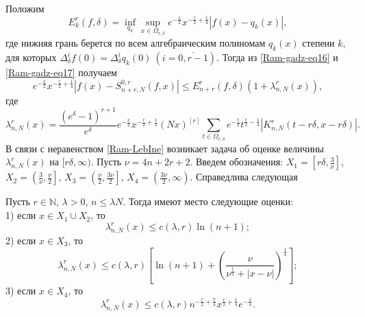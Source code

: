 Положим
\begin{equation}\label{Ram-gadz-eq17}
E_{k}^r(f,\delta)=\inf_{q_{k}}\sup_{x\in\Omega_{r,\delta}} e^{-{\frac{x}{2}}}x^{-{\frac{r}{2}}+{\frac{1}{4}}}\left|f(x)-q_{k}(x)\right|,
\end{equation}
где нижняя грань берется по всем алгебраическим полиномам $q_{k}(x)$ степени $k,$ для которых $\Delta_\delta^i f(0)=\Delta_\delta^i q_{k}(0)\ (i=\overline{0, r-1}).$
Тогда из \eqref{Ram-gadz-eq16} и \eqref{Ram-gadz-eq17} получаем
\begin{equation}\label{Ram-LebIne}
e^{-{\frac{x}{2}}}x^{-{\frac{r}{2}}+{\frac{1}{4}}}\left|f(x)-S_{n+r,N}^{0,r}(f,x)\right|\leq E_{n+r}^r(f,\delta)(1+\lambda_{n,N}^{r}(x)),
\end{equation}
где
$$
\lambda_{n,N}^{r}(x)=\frac{(e^{\delta}-1)^{r+1}}{e^\delta}e^{-{\frac{x}{2}}}x^{-{\frac{r}{2}}+{\frac{1}{4}}}(Nx)^{[r]}
\sum_{t\in\Omega_{r,\delta}}e^{-{\frac{t}{2}}}t^{{\frac{r}{2}}-{\frac{1}{4}}}
\left|K_{n,N}^r(t-r\delta,x-r\delta)\right|.
$$
В связи с неравенством \eqref{Ram-LebIne} возникает задача об оценке величины $\lambda_{n,N}^{r}(x)$ на $[r\delta,\infty)$. Пусть $\nu=4n+2r+2$. Введем обозначения:
$X_1=\left[r\delta, \frac{3}{\nu}\right]$,
$X_2=\left(\frac{3}{\nu}, \frac{\nu}{2}\right]$,
$X_3=\left(\frac{\nu}{2}, \frac{3\nu}{2}\right]$,
$X_4=\left(\frac{3\nu}{2}, \infty\right)$.
Справедлива следующая
\begin{theorem}\label{Ram-theoMex2}
Пусть $r\in\mathbb{N}$, $\lambda> 0$, $n\leq\lambda N.$ Тогда имеют место следующие оценки:\\
1) если $x\in X_1\cup X_2$, то
$$
\lambda_{n,N}^{r}(x)\leq c(\lambda, r)\ln (n+1);
$$
2) если $x\in X_3$, то
$$
\lambda_{n,N}^{r}(x)\leq c(\lambda,r)\left[\ln(n+1)+\left(\frac{\nu}{\nu^{\frac{1}{3}}+|x-\nu|}\right)^{\frac{1}{4}}\right];
$$
3) если $x\in X_4$, то
$$
\lambda_{n,N}^{r}(x)\leq c(\lambda,r)n^{-{\frac{r}{2}}+{\frac{7}{4}}}x^{{\frac{r}{2}}+{\frac{1}{4}}}e^{-\frac{x}{4}}.
$$
\end{theorem}





	




